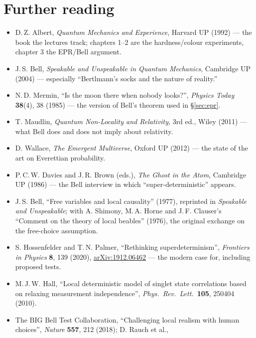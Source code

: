\documentclass[11pt,a4paper]{article}
\theoremstyle{remark}
\begin{document}
\section*{Further reading}
\begin{itemize}[nosep]
  \item D.\,Z. Albert, \emph{Quantum Mechanics and Experience}, Harvard UP (1992)
        --- the book the lectures track; chapters 1--2 are the hardness/colour
        experiments, chapter 3 the EPR/Bell argument.
  \item J.\,S. Bell, \emph{Speakable and Unspeakable in Quantum Mechanics},
        Cambridge UP (2004) --- especially ``Bertlmann's socks and the nature of
        reality.''
  \item N.\,D. Mermin, ``Is the moon there when nobody looks?'', \emph{Physics
        Today} \textbf{38}(4), 38 (1985) --- the version of Bell's theorem used in
        \S\ref{sec:epr}.
  \item T. Maudlin, \emph{Quantum Non-Locality and Relativity}, 3rd ed., Wiley
        (2011) --- what Bell does and does not imply about relativity.
  \item D. Wallace, \emph{The Emergent Multiverse}, Oxford UP (2012) --- the
        state of the art on Everettian probability.
  \item P.\,C.\,W. Davies and J.\,R. Brown (eds.), \emph{The Ghost in the Atom},
        Cambridge UP (1986) --- the Bell interview in which ``super-deterministic''
        appears.
  \item J.\,S. Bell, ``Free variables and local causality'' (1977), reprinted in
        \emph{Speakable and Unspeakable}; with A. Shimony, M.\,A. Horne and
        J.\,F. Clauser's ``Comment on the theory of local beables'' (1976),
        the original exchange on the free-choice assumption.
  \item S. Hossenfelder and T.\,N. Palmer, ``Rethinking superdeterminism'',
        \emph{Frontiers in Physics} \textbf{8}, 139 (2020),
        \href{https://arxiv.org/abs/1912.06462}{arXiv:1912.06462} --- the
        modern case for, including proposed tests.
  \item M.\,J.\,W. Hall, ``Local deterministic model of singlet state
        correlations based on relaxing measurement independence'',
        \emph{Phys.\ Rev.\ Lett.}\ \textbf{105}, 250404 (2010).
  \item The BIG Bell Test Collaboration, ``Challenging local realism with human
        choices'', \emph{Nature} \textbf{557}, 212 (2018); D. Rauch et al.,

\end{itemize}
\end{document}
